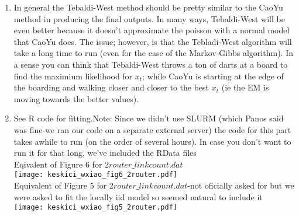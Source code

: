 \documentclass[paper=a4, fontsize=11pt]{scrartcl}
\begin{document}
\begin{enumerate}
\begin{enumerate}[1]
      \item In general the Tebaldi-West method should be pretty similar to the CaoYu method in producing the final outputs. In many ways, Tebaldi-West will be even better because it doesn't approximate the poisson with a normal model that CaoYu does. The issue; however, is that the Tebladi-West algorithm will take a long time to run (even for the case of the Markov-Gibbs algorithm). In a sense you can think that Tebaldi-West throws a ton of darts at a board to find the maximium likelihood for $x_t$; while CaoYu is starting at the edge of the boarding and walking closer and closer to the best $x_t$ (ie the EM is moving towards the better values).
      \item See R code for fitting.Note: Since we didn't use SLURM (which Panos said was fine-we ran our code on a separate external server) the code for this part takes awhile to run (on the order of several hours). In case you don't want to run it for that long, we've included the RData files \\
      \newpage
      Eqivalent of Figure 6 for $2router\_linkcount.dat$\\
      \texttt{[image: keskici\_wxiao\_fig6\_2router.pdf]}\\
      \newpage
      Equivalent of Figure 5 for $2router\_linkcount.dat$-not oficially asked for but we were asked to fit
      the locally iid model so seemed natural to include it\\
      \texttt{[image: keskici\_wxiao\_fig5\_2router.pdf]}

    \end{enumerate}
\end{enumerate}
\end{document}
